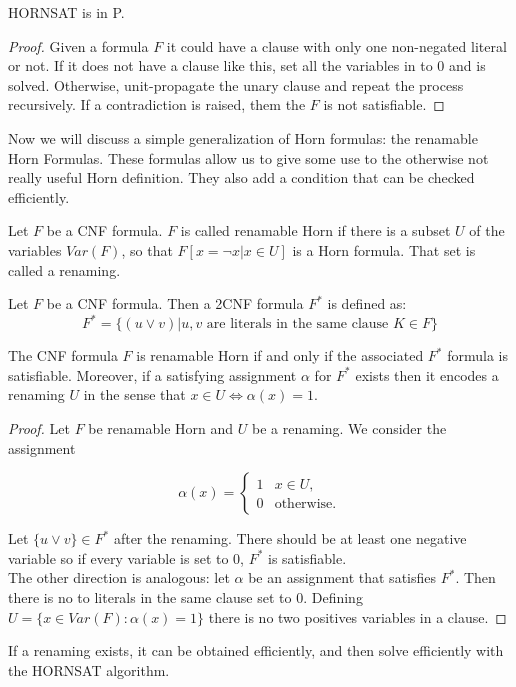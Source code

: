 \begin{proposition}
  HORNSAT is in P.
\end{proposition}
\begin{proof}
  Given a formula $F$ it could have a clause with only one non-negated literal or not. If it does not have a clause like this, set all the variables in to 0 and is solved. Otherwise, unit-propagate the unary clause and repeat the process recursively. If a contradiction is raised, them the $F$ is not satisfiable.
\end{proof}


Now we will discuss a simple generalization of Horn formulas: the renamable Horn Formulas. These formulas allow us to give some use to the otherwise not really useful Horn definition. They also add a condition that can be checked efficiently.

\begin{definition}
  Let $F$ be a CNF formula. $F$ is called renamable Horn if there is a subset $U$ of the variables $Var(F)$, so that $F[x=\neg x | x \in U]$ is a Horn formula.
  That set is called a renaming.
\end{definition}


\begin{definition}
  Let $F$ be a CNF formula. Then a 2CNF formula $F^*$ is defined as:
  $$F^* = \{(u \vee v) | u,v \text{ are literals in the same clause } K \in F \}$$
\end{definition}


\begin{theorem}
  The CNF formula $F$ is renamable Horn if and only if the associated $F^*$ formula is satisfiable. Moreover, if a satisfying assignment $\alpha$ for $F^*$  exists then it encodes a renaming $U$ in the sense that $x \in U \iff \alpha(x) = 1$.
\end{theorem}
\begin{proof}
  Let $F$ be renamable Horn and $U$ be a renaming. We consider the assignment

$$
\alpha(x)= 
\begin{cases}
1 & x \in U,\\
0 & \text{otherwise}.
\end{cases}
$$
 
  Let $\{u\vee v\} \in F^*$ after the renaming. There should be at least one negative variable so if every variable is set to 0, $F^*$ is satisfiable.\\

  The other direction is analogous: let $\alpha$ be an assignment that satisfies $F^*$. Then there is no to literals in the same clause set to 0. Defining $U=  \{x \in Var(F) : \alpha(x) = 1\}$ there is no two positives variables in a clause.
  \end{proof}


If a renaming exists, it can be obtained efficiently, and then solve efficiently with the HORNSAT algorithm.






